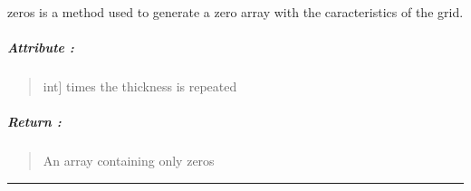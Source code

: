 \documentclass[letterpaper,10pt,english]{sphinxmanual}
\begin{document}
\begin{fulllineitems}
\label{\detokenize{GRID_doc/GRID_class_doc:SL_C0de.grid.GRID.zeros}}
\pysigstartsignatures
{}
\pysigstopsignatures
\sphinxAtStartPar
{}\label{\detokenize{GRID_doc/GRID_class_doc:zeros}}zeros is a method used to generate a zero array with the caracteristics of the grid.


\subparagraph{Attribute :}
\label{\detokenize{GRID_doc/GRID_class_doc:id7}}\begin{quote}
\begin{description}
\sphinxlineitem{tx}{[}int{]}
\sphinxAtStartPar
times the thickness is repeated

\end{description}
\end{quote}


\subparagraph{Return :}
\label{\detokenize{GRID_doc/GRID_class_doc:id8}}\begin{quote}
\begin{description}
\sphinxAtStartPar
An array containing only zeros

\end{description}
\end{quote}

\end{fulllineitems}



\bigskip\hrule\bigskip


\begin{fulllineitems}
\label{\detokenize{GRID_doc/GRID_class_doc:SL_C0de.grid.GRID.along_transect}}
\pysigstartsignatures
{}
\pysigstopsignatures
\end{fulllineitems}
\end{document}
